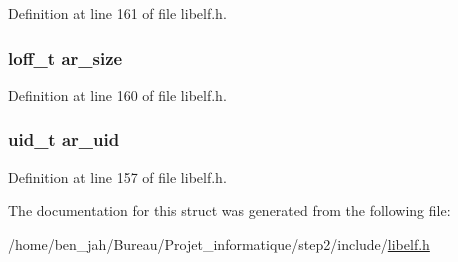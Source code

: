 \-Definition at line 161 of file libelf.\-h.

\hypertarget{struct_elf___arhdr_a604bd99d46718a74378e0b1a5690faf4}{
\subsubsection[{ar\-\_\-size}]{\setlength{\rightskip}{0pt plus 5cm}loff\-\_\-t {\bf ar\-\_\-size}}}\label{struct_elf___arhdr_a604bd99d46718a74378e0b1a5690faf4}


\-Definition at line 160 of file libelf.\-h.

\hypertarget{struct_elf___arhdr_a70452a4221037e637533f4f208bd9122}{
\subsubsection[{ar\-\_\-uid}]{\setlength{\rightskip}{0pt plus 5cm}uid\-\_\-t {\bf ar\-\_\-uid}}}\label{struct_elf___arhdr_a70452a4221037e637533f4f208bd9122}


\-Definition at line 157 of file libelf.\-h.



\-The documentation for this struct was generated from the following file\-:\begin{DoxyCompactItemize}
\item 
/home/ben\-\_\-jah/\-Bureau/\-Projet\-\_\-informatique/step2/include/\hyperlink{libelf_8h}{libelf.\-h}\end{DoxyCompactItemize}
